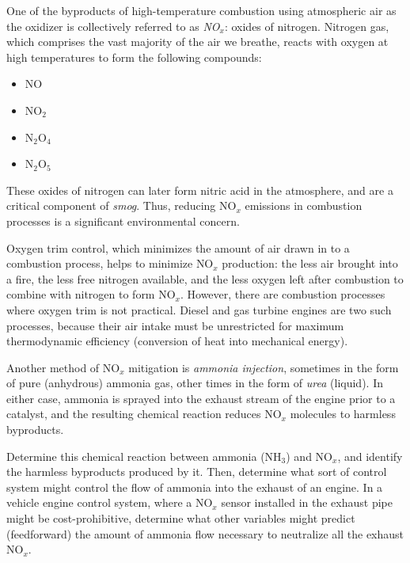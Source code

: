 

One of the byproducts of high-temperature combustion using atmospheric air as the oxidizer is collectively referred to as {\it NO$_{x}$}: oxides of nitrogen.  Nitrogen gas, which comprises the vast majority of the air we breathe, reacts with oxygen at high temperatures to form the following compounds:

\begin{itemize}
\item{} NO
\item{} NO$_{2}$
\item{} N$_{2}$O$_{4}$
\item{} N$_{2}$O$_{5}$
\end{itemize}

These oxides of nitrogen can later form nitric acid in the atmosphere, and are a critical component of {\it smog}.  Thus, reducing NO$_{x}$ emissions in combustion processes is a significant environmental concern.

\vskip 10pt

Oxygen trim control, which minimizes the amount of air drawn in to a combustion process, helps to minimize NO$_{x}$ production: the less air brought into a fire, the less free nitrogen available, and the less oxygen left after combustion to combine with nitrogen to form NO$_{x}$.  However, there are combustion processes where oxygen trim is not practical.  Diesel and gas turbine engines are two such processes, because their air intake must be unrestricted for maximum thermodynamic efficiency (conversion of heat into mechanical energy).

Another method of NO$_{x}$ mitigation is {\it ammonia injection}, sometimes in the form of pure (anhydrous) ammonia gas, other times in the form of {\it urea} (liquid).  In either case, ammonia is sprayed into the exhaust stream of the engine prior to a catalyst, and the resulting chemical reaction reduces NO$_{x}$ molecules to harmless byproducts.  

\vskip 10pt

Determine this chemical reaction between ammonia (NH$_{3}$) and NO$_{x}$, and identify the harmless byproducts produced by it.  Then, determine what sort of control system might control the flow of ammonia into the exhaust of an engine.  In a vehicle engine control system, where a NO$_{x}$ sensor installed in the exhaust pipe might be cost-prohibitive, determine what other variables might predict (feedforward) the amount of ammonia flow necessary to neutralize all the exhaust NO$_{x}$.

